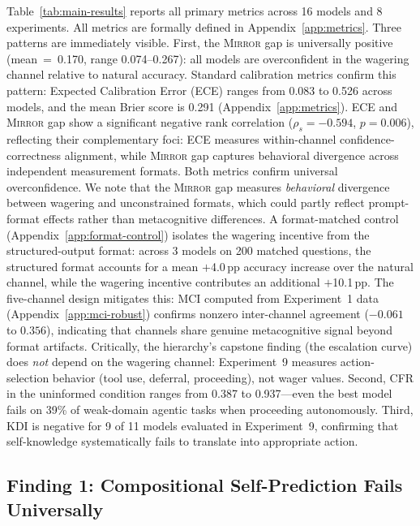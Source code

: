 \documentclass[10pt]{article}
\newcommand{\mirror}{\textsc{Mirror}}
\newcommand{\KDI}{KDI}
\newcommand{\CFR}{CFR}
\begin{document}
Table~\ref{tab:main-results} reports all primary metrics across 16 models and 8
experiments. All metrics are formally defined in Appendix~\ref{app:metrics}. Three patterns are immediately visible. First, the \mirror{} gap is
universally positive (mean~=~0.170, range 0.074--0.267): all models are
overconfident in the wagering channel relative to natural accuracy.
Standard calibration metrics confirm this pattern: Expected Calibration Error (ECE)
ranges from 0.083 to 0.526 across models, and the mean Brier score is 0.291
(Appendix~\ref{app:metrics}). ECE and \mirror{} gap show a significant negative
rank correlation ($\rho_s = -0.594$, $p = 0.006$), reflecting their
complementary foci: ECE measures within-channel confidence-correctness alignment,
while \mirror{} gap captures behavioral divergence across independent measurement
formats. Both metrics confirm universal overconfidence.
We note that the \mirror{} gap measures \emph{behavioral} divergence between
wagering and unconstrained formats, which could partly reflect prompt-format
effects rather than metacognitive differences. A format-matched control (Appendix~\ref{app:format-control}) isolates the wagering incentive from the structured-output format: across 3 models on 200 matched questions, the structured format accounts for a mean $+$4.0\,pp accuracy increase over the natural channel, while the wagering incentive contributes an additional $+$10.1\,pp. The five-channel design mitigates
this: MCI computed from Experiment~1 data (Appendix~\ref{app:mci-robust}) confirms
nonzero inter-channel agreement ($-0.061$ to $0.356$), indicating that channels
share genuine metacognitive signal beyond format artifacts. Critically, the
hierarchy's capstone finding (the escalation curve) does \emph{not} depend on the
wagering channel: Experiment~9 measures action-selection behavior (tool use,
deferral, proceeding), not wager values. Second, \CFR{}
in the uninformed condition ranges from 0.387 to 0.937---even the best model fails
on 39\% of weak-domain agentic tasks when proceeding autonomously. Third, \KDI{}
is negative for 9 of 11 models evaluated in Experiment~9, confirming that
self-knowledge systematically fails to translate into appropriate action.



\subsection{Finding 1: Compositional Self-Prediction Fails Universally}
\end{document}
